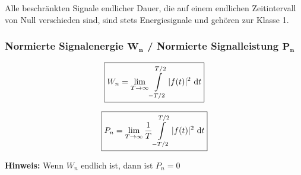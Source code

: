 Alle beschränkten Signale endlicher Dauer, die auf einem endlichen Zeitintervall von Null verschieden sind, 
sind stets Energiesignale und gehören zur Klasse 1.

\subsubsection{Normierte Signalenergie $\bm{W_n}$ / Normierte Signalleistung $\bm{P_n}$}

\begin{minipage}{0.48\columnwidth}
    $$ \boxed{ W_n = \lim\limits_{T \to \infty} \int\limits_{-T/2}^{T/2} \vert f(t) \vert ^2 \, \mathop{} \! \mathrm{d} t } $$
\end{minipage}
\hfill
\begin{minipage}{0.48\columnwidth}
    $$ \boxed{ P_n = \lim\limits_{T \to \infty} \frac{1}{T} \int\limits_{-T/2}^{T/2} \vert f(t) \vert ^2 \, \mathop{} \! \mathrm{d} t } $$ 
\end{minipage}

\vspace{0.2cm}

\textbf{Hinweis:} Wenn $W_n$ endlich ist, dann ist $P_n = 0$

